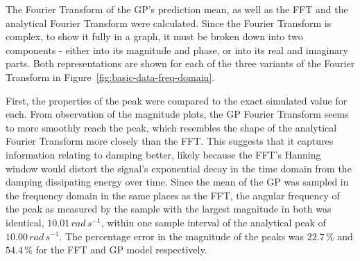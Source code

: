 \documentclass[12pt]{article}
\begin{document}
    The Fourier Transform of the GP's prediction mean, as well as the FFT and the analytical Fourier Transform were calculated.
    Since the Fourier Transform is complex, to show it fully in a graph, it must be broken down into two components - either into its magnitude and phase, or into its real and imaginary parts.
    Both representations are shown for each of the three variants of the Fourier Transform in Figure~\ref{fig:basic-data-freq-domain}.

    First, the properties of the peak were compared to the exact simulated value for each.
    From observation of the magnitude plots, the GP Fourier Transform seems to more smoothly reach the peak, which resembles the shape of the analytical Fourier Transform more closely than the FFT.
    This suggests that it captures information relating to damping better, likely because the FFT's Hanning window would distort the signal's exponential decay in the time domain from the damping dissipating energy over time.
    Since the mean of the GP was sampled in the frequency domain in the same places as the FFT, the angular frequency of the peak as measured by the sample with the largest magnitude in both was identical, $10.01 \, rad \, s^{-1}$, within one sample interval of the analytical peak of $10.00 \, rad \, s^{-1}$.
    The percentage error in the magnitude of the peaks was $22.7 \, \%$ and $54.4 \, \%$ for the FFT and GP model respectively.
\end{document}
